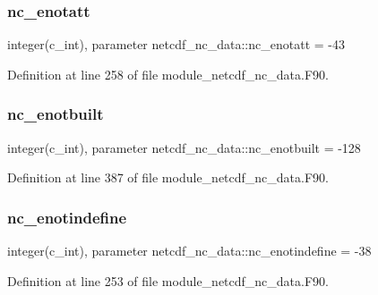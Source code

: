 \subsubsection{\texorpdfstring{nc\+\_\+enotatt}{nc\_enotatt}}
{\footnotesize\ttfamily integer(c\+\_\+int), parameter netcdf\+\_\+nc\+\_\+data\+::nc\+\_\+enotatt = -\/43}



Definition at line 258 of file module\+\_\+netcdf\+\_\+nc\+\_\+data.\+F90.

\mbox{\label{namespacenetcdf__nc__data_aab71e3cdefb6b14499cc3d7144a1ea93}} 
\subsubsection{\texorpdfstring{nc\+\_\+enotbuilt}{nc\_enotbuilt}}
{\footnotesize\ttfamily integer(c\+\_\+int), parameter netcdf\+\_\+nc\+\_\+data\+::nc\+\_\+enotbuilt = -\/128}



Definition at line 387 of file module\+\_\+netcdf\+\_\+nc\+\_\+data.\+F90.

\mbox{\label{namespacenetcdf__nc__data_a48dc2fa7138496eb1e88d440796aad4c}} 
\subsubsection{\texorpdfstring{nc\+\_\+enotindefine}{nc\_enotindefine}}
{\footnotesize\ttfamily integer(c\+\_\+int), parameter netcdf\+\_\+nc\+\_\+data\+::nc\+\_\+enotindefine = -\/38}



Definition at line 253 of file module\+\_\+netcdf\+\_\+nc\+\_\+data.\+F90.

\mbox{\label{namespacenetcdf__nc__data_a54890d95abf2cb564d7294f2f7e04af6}} 
